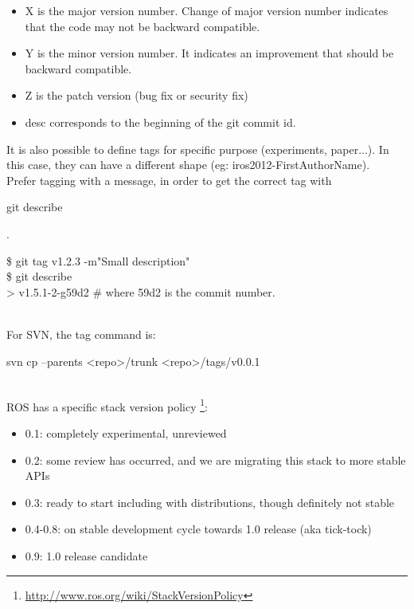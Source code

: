 \begin{itemize}[noitemsep,topsep=0pt,parsep=0pt,partopsep=0pt]
\item X is the major version number. Change of major version number indicates that the code may not be backward compatible.
\item Y is the minor version number. It indicates an improvement that should be backward compatible.
\item Z is the patch version (bug fix or security fix) 
\item desc corresponds to the beginning of the git commit id.
\end{itemize}

It is also possible to define tags for specific purpose (experiments, paper...).
In this case, they can have a different shape (eg: iros2012-FirstAuthorName).\\

Prefer tagging with a message, in order to get the correct tag with \begin{tt}git describe\end{tt}.\\
\begin{tt}
\$ git tag v1.2.3 -m"Small description"\\
\$ git describe\\
> v1.5.1-2-g59d2 \# where 59d2 is the commit number.
\end{tt}\\

For SVN, the tag command is:\\ 
\begin{tt}svn cp --parents <repo>/trunk <repo>/tags/v0.0.1\end{tt}\\


ROS has a specific stack version policy \footnote{\url{http://www.ros.org/wiki/StackVersionPolicy}}:
\begin{itemize}[noitemsep,topsep=0pt,parsep=0pt,partopsep=0pt]
\item 0.1: completely experimental, unreviewed
\item 0.2: some review has occurred, and we are migrating this stack to more stable APIs
\item 0.3: ready to start including with distributions, though definitely not stable
\item 0.4-0.8: on stable development cycle towards 1.0 release (aka tick-tock)
\item 0.9: 1.0 release candidate
\end{itemize}


